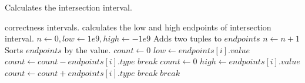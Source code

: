 \begin{algorithm}[!t]
    \centering
    \small
    \caption{Calculates the intersection interval.}
    \begin{algorithmic}[1]
        \REQUIRE
            correctness intervals.
        \ENSURE
            calculates the low and high endpoints of intersection interval.
        \STATE
        \STATE
            $n \leftarrow 0, low \leftarrow 1e9, high \leftarrow -1e9$
            \STATE
            Adds two tuples to $endpoints$
            \STATE
            $n \leftarrow n + 1$
        \ENDFOR
        \STATE
            Sorts $endpoints$ by the value.
        \STATE
        \STATE
            \STATE
            \STATE
            $count \leftarrow 0$
                \STATE
                $low \leftarrow endpoints[i].value$
                \STATE
                $count \leftarrow count - endpoints[i].type$
                \STATE
                    $break$
                \ENDIF
            \ENDFOR
            \STATE
            \STATE
            \STATE
            $count \leftarrow 0$
                \STATE
                $high \leftarrow endpoints[i].value$
                \STATE
                $count \leftarrow count + endpoints[i].type$
                    \STATE
                    $break$
                \ENDIF
            \ENDFOR
            \STATE
            \STATE
                \STATE
                $break$
            \ENDIF
        \ENDFOR
    \end{algorithmic}
\label{alg:intersection_interval}
\end{algorithm}

